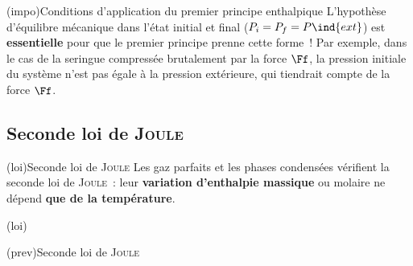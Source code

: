 \documentclass[../../main/main.tex]{subfiles}
\begin{document}
\begin{tcb*}[%
		list entry={\hspace*{-20pt}\protect\rcheck~~Conditions 1\ier{} ppe.\ enthalpique}%
	](impo){Conditions d'application du premier principe enthalpique}
	L’hypothèse d’équilibre mécanique dans l’état initial et final ($P_i = P_f =
		P\ind{ext}$) est \textbf{essentielle} pour que le premier principe prenne
	cette forme~! Par exemple, dans le cas de la seringue compressée brutalement
	par la force $\Ff$, la pression initiale du système n’est pas égale à la
	pression extérieure, qui tiendrait compte de la force $\Ff$.
\end{tcb*}

\subsection{Seconde loi de \textsc{Joule}}

\begin{tcb*}(loi){Seconde loi de \textsc{Joule}}
	Les gaz parfaits et les phases condensées vérifient la seconde loi de
	\textsc{Joule}~: leur \textbf{variation d'enthalpie massique} ou molaire
	ne dépend \textbf{que de la température}.
	\smallbreak
	\begin{isd}[sidebyside align=top, interior hidden](loi)
		\psw{%
			\[
				\boxed{h = h(T)}
			\]
		}%
		\vspace{-15pt}
		\tcblower
		\psw{%
			\[
				\boxed{H_m = \frac{D+2}{2}RT}
			\]
		}%
		\vspace{-15pt}
	\end{isd}
\end{tcb*}

\begin{tcb*}[sidebyside](prev){Seconde loi de \textsc{Joule}}
	\vspace{-15pt}
	\tcblower
	\vspace{-15pt}
\end{tcb*}
\end{document}
